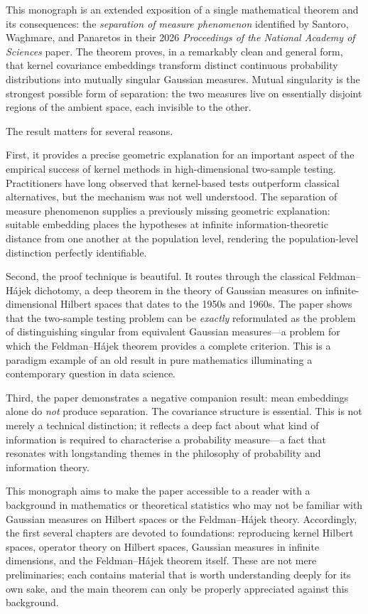 \documentclass[12pt, oneside]{book}
\theoremstyle{plain}
\theoremstyle{definition}
\begin{document}
This monograph is an extended exposition of a single mathematical theorem and its consequences: the \emph{separation of measure phenomenon} identified by Santoro, Waghmare, and Panaretos in their 2026 \textit{Proceedings of the National Academy of Sciences} paper. The theorem proves, in a remarkably clean and general form, that kernel covariance embeddings transform distinct continuous probability distributions into mutually singular Gaussian measures. Mutual singularity is the strongest possible form of separation: the two measures live on essentially disjoint regions of the ambient space, each invisible to the other.

The result matters for several reasons.

First, it provides a precise geometric explanation for an important aspect of the empirical success of kernel methods in high-dimensional two-sample testing. Practitioners have long observed that kernel-based tests outperform classical alternatives, but the mechanism was not well understood. The separation of measure phenomenon supplies a previously missing geometric explanation: suitable embedding places the hypotheses at infinite information-theoretic distance from one another at the population level, rendering the population-level distinction perfectly identifiable.

Second, the proof technique is beautiful. It routes through the classical Feldman--H\'ajek dichotomy, a deep theorem in the theory of Gaussian measures on infinite-dimensional Hilbert spaces that dates to the 1950s and 1960s. The paper shows that the two-sample testing problem can be \emph{exactly} reformulated as the problem of distinguishing singular from equivalent Gaussian measures---a problem for which the Feldman--H\'ajek theorem provides a complete criterion. This is a paradigm example of an old result in pure mathematics illuminating a contemporary question in data science.

Third, the paper demonstrates a negative companion result: mean embeddings alone do \emph{not} produce separation. The covariance structure is essential. This is not merely a technical distinction; it reflects a deep fact about what kind of information is required to characterise a probability measure---a fact that resonates with longstanding themes in the philosophy of probability and information theory.

This monograph aims to make the paper accessible to a reader with a background in mathematics or theoretical statistics who may not be familiar with Gaussian measures on Hilbert spaces or the Feldman--H\'ajek theory. Accordingly, the first several chapters are devoted to foundations: reproducing kernel Hilbert spaces, operator theory on Hilbert spaces, Gaussian measures in infinite dimensions, and the Feldman--H\'ajek theorem itself. These are not mere preliminaries; each contains material that is worth understanding deeply for its own sake, and the main theorem can only be properly appreciated against this background.
\end{document}
